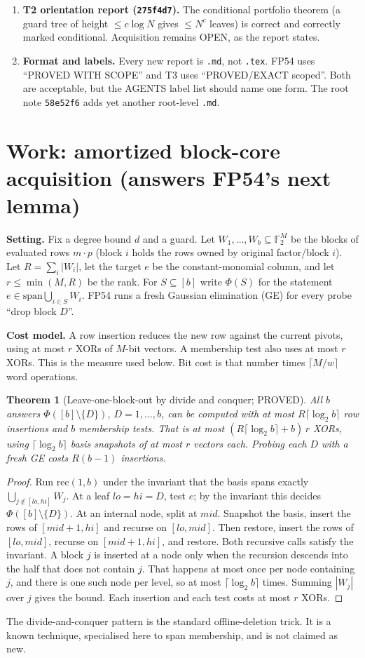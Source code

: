 \documentclass[11pt]{article}
\newtheorem{theorem}{Theorem}
\theoremstyle{definition}
\newcommand{\F}{\mathbb{F}_2}
\begin{document}
\begin{enumerate}
\item \textbf{T2 orientation report (\texttt{275f4d7}).} The conditional portfolio theorem (a guard tree of height $\le c\log N$ gives $\le N^c$ leaves) is correct and correctly marked conditional. Acquisition remains OPEN, as the report states.
\item \textbf{Format and labels.} Every new report is \texttt{.md}, not \texttt{.tex}. FP54 uses ``PROVED WITH SCOPE'' and T3 uses ``PROVED/EXACT scoped''. Both are acceptable, but the AGENTS label list should name one form. The root note \texttt{58e52f6} adds yet another root-level \texttt{.md}.
\end{enumerate}

\section{Work: amortized block-core acquisition (answers FP54's next lemma)}
\textbf{Setting.} Fix a degree bound $d$ and a guard. Let $W_1,\dots,W_b\subseteq\F^M$ be the blocks of evaluated rows $m\cdot p$ (block $i$ holds the rows owned by original factor/block $i$). Let $R=\sum_i|W_i|$, let the target $e$ be the constant-monomial column, and let $r\le\min(M,R)$ be the rank. For $S\subseteq[b]$ write $\Phi(S)$ for the statement $e\in\mathrm{span}\bigcup_{i\in S}W_i$. FP54 runs a fresh Gaussian elimination (GE) for every probe ``drop block $D$''.

\textbf{Cost model.} A row insertion reduces the new row against the current pivots, using at most $r$ XORs of $M$-bit vectors. A membership test also uses at most $r$ XORs. This is the measure used below. Bit cost is that number times $\lceil M/w\rceil$ word operations.

\begin{theorem}[Leave-one-block-out by divide and conquer; PROVED]\label{thm:lobo}
All $b$ answers $\Phi([b]\setminus\{D\})$, $D=1,\dots,b$, can be computed with at most $R\lceil\log_2 b\rceil$ row insertions and $b$ membership tests. That is at most $(R\lceil\log_2b\rceil+b)\,r$ XORs, using $\lceil\log_2 b\rceil$ basis snapshots of at most $r$ vectors each. Probing each $D$ with a fresh GE costs $R(b-1)$ insertions.
\end{theorem}
\begin{proof}
Run $\mathrm{rec}(1,b)$ under the invariant that the basis spans exactly $\bigcup_{j\notin[lo,hi]}W_j$. At a leaf $lo=hi=D$, test $e$; by the invariant this decides $\Phi([b]\setminus\{D\})$. At an internal node, split at $mid$. Snapshot the basis, insert the rows of $[mid+1,hi]$ and recurse on $[lo,mid]$. Then restore, insert the rows of $[lo,mid]$, recurse on $[mid+1,hi]$, and restore. Both recursive calls satisfy the invariant. A block $j$ is inserted at a node only when the recursion descends into the half that does not contain $j$. That happens at most once per node containing $j$, and there is one such node per level, so at most $\lceil\log_2b\rceil$ times. Summing $|W_j|$ over $j$ gives the bound. Each insertion and each test costs at most $r$ XORs.
\end{proof}
The divide-and-conquer pattern is the standard offline-deletion trick. It is a known technique, specialised here to span membership, and is not claimed as new.
\end{document}
